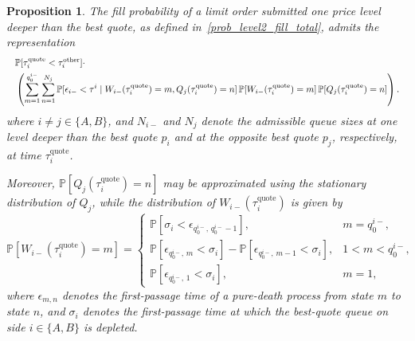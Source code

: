 \documentclass[11pt]{article}
\newtheorem{proposition}{Proposition}
\begin{document}
\begin{proposition}
The fill probability of a limit order submitted one price level deeper than the best quote, as defined in~\eqref{prob_level2_fill_total}, admits the representation
\begin{equation}\label{prob_level2}
\resizebox{1.0\hsize}{!}{$
\begin{aligned}
&\mathbb{P}[\tau_i^{\text{quote}}<\tau_i^{\text{other}}]\cdot\\
&\left(\sum_{m=1}^{q_0^{i-}}\sum_{n=1}^{N_j}
\mathbb{P}[\epsilon_{i-}<\tau^i \mid W_{i-}(\tau_i^{\text{quote}})=m,Q_j(\tau_i^{\text{quote}})=n]\,
\mathbb{P}[W_{i-}(\tau_i^{\text{quote}})=m]\,
\mathbb{P}[Q_j(\tau_i^{\text{quote}})=n]
\right).
\end{aligned}
$}
\end{equation}
where $i\neq j\in\{A,B\}$, and $N_{i-}$ and $N_j$ denote the admissible queue sizes at one level deeper than the best quote $p_i$ and at the opposite best quote $p_j$, respectively, at time $\tau_i^{\text{quote}}$.

Moreover, $\mathbb{P}[Q_j(\tau_i^{\text{quote}})=n]$ may be approximated using the stationary distribution of $Q_j$, while the distribution of $W_{i-}(\tau_i^{\text{quote}})$ is given by
\begin{equation}\label{prob_level2_bid}
\mathbb{P}[W_{i-}(\tau_i^{\text{quote}})=m]=
\begin{cases}
\mathbb{P}[\sigma_i<\epsilon_{q_0^{i-},\,q_0^{i-}-1}], & m=q_0^{i-}, \\[0.4em]
\mathbb{P}[\epsilon_{q_0^{i-},\,m}<\sigma_i]-\mathbb{P}[\epsilon_{q_0^{i-},\,m-1}<\sigma_i], & 1<m<q_0^{i-}, \\[0.4em]
\mathbb{P}[\epsilon_{q_0^{i-},\,1}<\sigma_i], & m=1,
\end{cases}
\end{equation}
where $\epsilon_{m,n}$ denotes the first-passage time of a pure-death process from state $m$ to state $n$, and $\sigma_i$ denotes the first-passage time at which the best-quote queue on side $i\in\{A,B\}$ is depleted.
\end{proposition}
\end{document}
